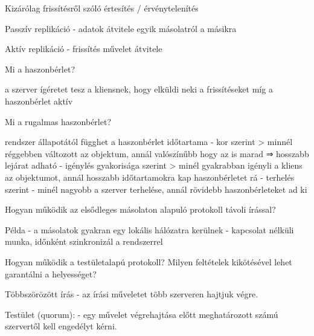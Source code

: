 \documentclass[twoside, a4paper, 12pt]{article}
\begin{document}
\begin{description}
                                    \item Kizárólag frissítésről szóló értesítés / érvénytelenítés
                                    \item Passzív replikáció
                                        - adatok átvitele egyik másolatról a másikra
                                    \item Aktív replikáció
                                        - frissítés művelet átvitele
                                    \item  Mi a haszonbérlet?	
                                    \item a szerver ígéretet tesz a kliensnek, hogy elküldi neki a frissítéseket míg a haszonbérlet aktív
                                    \item  Mi a rugalmas haszonbérlet?
                                    \item rendszer állapotától függhet a haszonbérlet időtartama
                                        - kor szerint 
                                        > minnél réggebben változott az objektum, annál valószínűbb hogy az is marad 
                                        ⇒ hosszabb lejárat adható
                                        - igénylés gyakorisága szerint
                                        > minél gyakrabban igényli a kliens az objektumot, annál hosszabb időtartamokra kap haszonbérletet rá
                                        - terhelés szerint
                                        - minél nagyobb a szerver terhelése, annál rövidebb haszonbérleteket ad ki 
                                    \item  Hogyan működik az elsődleges másolaton alapuló protokoll távoli írással?	
                                    \item Példa
                                        - a másolatok gyakran egy lokális hálózatra kerülnek
                                        - kapcsolat nélküli munka, időnként szinkronizál a rendszerrel	
                                    \item  Hogyan működik a testületalapú protokoll? Milyen feltételek kikötésével lehet garantálni a helyességet?
                                    \item Többszörözött írás
                                        - az írási műveletet több szerveren hajtjuk végre.
                                    \item Testület (quorum): 
                                        - egy művelet végrehajtása előtt meghatározott számú szervertől kell engedélyt kérni.

\end{description}
\end{document}
